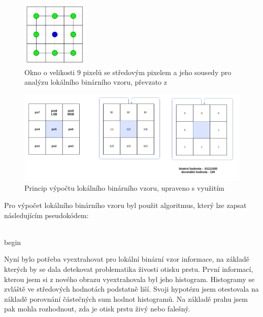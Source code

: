\begin{figure}[htbp]
    \centering
    \includegraphics[width=120px]{obrazky-figures/lbpn.png}
    \caption{Okno o velikosti 9 pixelů se středovým pixelem a jeho sousedy pro analýzu lokálního binárního vzoru, převzato z \cite{GragnanielloStudy}}
\end{figure}

\begin{figure}[htbp]
    \centering
    \includegraphics[width=460px]{obrazky-figures/lbpprincip.png}
    \caption{Princip výpočtu lokálního binárního vzoru, upraveno s využitím \cite{GaikwadStudy}}
\end{figure}

Pro výpočet lokálního binárního vzoru byl použit algoritmus, který lze zapsat následujícím pseudokódem:\\\\
\begin{algorithm}[H]
 begin\;
\end{algorithm}

 Nyní bylo potřeba vyextrahovat pro lokální binární vzor informace, na základě kterých by se dala detekovat problematika živosti otisku prstu. První informací, kterou jsem si z nového obrazu vyextrahovala byl jeho histogram. Histogramy se zvláště ve středových hodnotách podstatně liší. Svoji hypotézu jsem otestovala na základě porovnání částečných sum hodnot histogramů. Na základě prahu jsem pak mohla rozhodnout, zda je otisk prstu živý nebo falešný.
 
